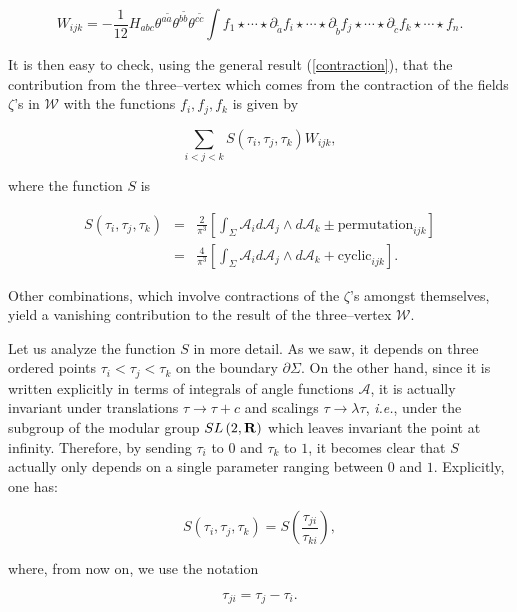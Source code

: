 \documentclass[a4paper,11pt]{article}
\newcommand{\mathbb}[1]{{\bf{#1}}}
\newcommand{\text}[1]{{{#1}}}
\begin{document}
$$
W_{ijk}=-\frac{1}{12}H_{abc}\theta ^{a\widetilde{a}}\theta ^{b\widetilde{b}}
\theta ^{c\widetilde{c}}\int f_{1}\star \cdots \star \partial _{\widetilde{a}}
f_{i}\star \cdots \star \partial _{\widetilde{b}}f_{j}\star \cdots \star
\partial _{\widetilde{c}}f_{k}\star \cdots \star f_{n}.
$$

\noindent
It is then easy to check, using the general result (\ref{contraction}), that
the contribution from the three--vertex which comes from the contraction of
the fields $\zeta $'s in $\mathcal{W}$ with the functions $f_{i},f_{j},f_{k}$
is given by

$$
\sum_{i<j<k} S\left( \tau _{i},\tau _{j},\tau _{k}\right) W_{ijk},
$$

\noindent
where the function $S$ is 

\begin{eqnarray*}
S\left( \tau _{i},\tau _{j},\tau _{k}\right) &=&\frac{2}{\pi ^{3}}\left[
\int_{\Sigma }\mathcal{A}_{i}d\mathcal{A}_{j}\wedge d\mathcal{A}_{k}\pm 
\text{\textrm{permutation}}_{ijk}\right] \\
&=&\frac{4}{\pi ^{3}}\left[ \int_{\Sigma }\mathcal{A}_{i}d\mathcal{A}_{j}
\wedge d\mathcal{A}_{k}+\mathrm{cyclic}_{ijk}\right] .
\end{eqnarray*}

\noindent
Other combinations, which involve contractions of the $\zeta$'s 
amongst themselves, yield a vanishing contribution to the result of the 
three--vertex $\mathcal{W}$.

Let us analyze the function $S$ in more detail. As we saw, it depends on
three ordered points $\tau _{i}<\tau _{j}<\tau _{k}$ on the boundary 
$\partial \Sigma $. On the other hand, since it is written explicitly in
terms of integrals of angle functions $\mathcal{A}$, it is actually
invariant under translations $\tau \rightarrow \tau +c$ and scalings 
$\tau \rightarrow \lambda \tau $, \textit{i.e.}, under the subgroup of the
modular group $SL\left( 2,\mathbb{R}\right) $ which leaves invariant the
point at infinity. Therefore, by sending $\tau _{i}$ to $0$ and $\tau _{k}$
to $1$, it becomes clear that $S$ actually only depends on a single 
parameter ranging between $0$ and $1$. Explicitly, one has:

$$
S\left( \tau _{i},\tau _{j},\tau _{k}\right) =S\left( \frac{\tau _{ji}}{\tau
_{ki}}\right),
$$

\noindent
where, from now on, we use the notation 

$$
\tau _{ji}=\tau _{j}-\tau _{i}.
$$
\end{document}
